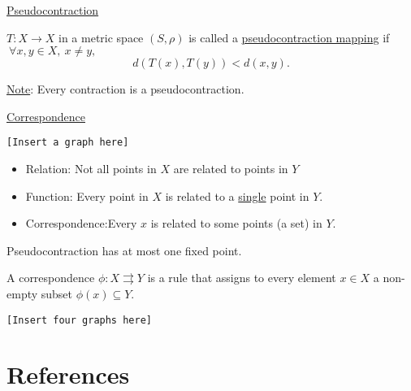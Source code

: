 \documentclass[twoside]{article}
\begin{document}
\underline{Pseudocontraction}

$T:X\to X$ in a metric space $(S, \rho)$ is called a \underline{pseudocontraction mapping} if $~\forall x, y \in X, ~ x\neq y,$ \[
d(T(x),T(y)) < d(x,y).
\]

\underline{Note}: Every contraction is a pseudocontraction.

\underline{Correspondence}
\begin{center}
    \texttt{[Insert a graph here]}
\end{center}

\begin{itemize}
    \item Relation: Not all points in $X$ are related to points in $Y$
    \item Function: Every point in $X$ is related to a \underline{single} point in $Y$.
    \item Correspondence:Every $x$ is related to some points (a set) in $Y$.
\end{itemize}
\begin{lemma}
    Pseudocontraction has at most one fixed point.
\end{lemma}

\begin{definition}
    A correspondence $\phi : X \rightrightarrows Y $ is a rule that assigns to every element $x \in X$ a non-empty subset $\phi(x) \subseteq Y$.
\end{definition}

\begin{center}
    \texttt{[Insert four graphs here]}
\end{center}



























\clearpage
\section*{References}

\end{document}
